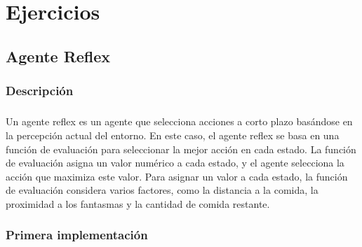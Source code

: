 \documentclass{report}
\begin{document}
    \chapter{Ejercicios}
      \section{Agente Reflex}
        \subsection*{Descripción}
          \paragraph*{}{
            Un agente reflex es un agente que selecciona acciones a corto plazo basándose en la percepción actual del entorno. 
            En este caso, el agente reflex se basa en una función de evaluación para seleccionar la mejor acción en cada estado. 
            La función de evaluación asigna un valor numérico a cada estado, y el agente selecciona la acción que maximiza este valor.
            Para asignar un valor a cada estado, la función de evaluación considera varios factores, como la distancia a la comida, la proximidad a los fantasmas y la cantidad de comida restante.
          }
        \subsection*{Primera implementación}
          \begin{lstlisting}[language=Python, caption=Implementación inicial del agente reflex]
          \end{lstlisting}
\end{document}
